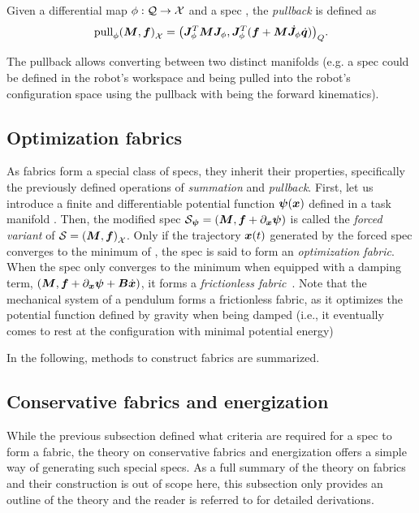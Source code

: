 Given a differential map $\phi: \mathcal{Q}\rightarrow\mathcal{X}$ and a spec
\spec{}, the \textit{pullback} is defined as
\begin{equation}
  \textrm{pull}_{\phi}{\left(\bm{M},\bm{f}\right)_{\mathcal{X}}} = {\left(\bm{J}^T_{\phi}\bm{M}\bm{J}_{\phi}, \bm{J}^T_{\phi}(\bm{f}+\bm{M}\dot{\bm{J}}_{\phi}\dot{\bm{q}})\right)}_{Q}.
  \label{eq:pullback}
\end{equation}

The pullback allows converting between two distinct
manifolds (e.g. a spec could be defined in the robot's
workspace and being pulled into the robot's configuration
space using the pullback with \map{} being the forward
kinematics).

\subsection{Optimization fabrics}%
\label{sub:optimization_fabrics}

As \ac{fabrics} form a special class of specs, they
inherit their properties, specifically the previously
defined operations of \textit{summation} and
\textit{pullback}. First, let us introduce a finite and
differentiable potential function $\bm{\psi}(\bm{x})$ defined in a
task manifold \X{}. Then, the modified spec $\mathcal{S}_{\bm{\psi}} =
\left(\bm{M},\bm{f} + \partial_{\bm{x}}\bm{\psi}\right)$ is called the
\textit{forced variant} of $\mathcal{S} = \left(\bm{M},\bm{f}\right)_{\mathcal{X}}$. Only if the
trajectory $\bm{x}(t)$ generated by the forced spec converges to
the minimum of \forc{}, the spec is said to form an
\textit{optimization fabric}. When the spec only converges
to the minimum when equipped with a damping term,
$\left(\bm{M},\bm{f} + \partial_{\bm{x}}\bm{\psi} + \bm{B}\dot{\bm{x}}\right)$, it
forms a \textit{frictionless fabric}~\cite[Definition
4.4]{Ratliff2020}. Note that the mechanical system of a
pendulum forms a frictionless fabric, as it optimizes the
potential function defined by gravity when being damped
(i.e., it eventually comes to rest at the configuration with
minimal potential energy)

In the following, methods to construct \ac{fabrics} are
summarized.

\subsection{Conservative fabrics and energization}%
\label{sub:conservative_fabrics_and_energization}

While the previous subsection defined what criteria are required for a spec to form
a \ac{fabric}, the theory on conservative fabrics and energization 
offers a simple way of generating such special specs. As a full summary of the theory
on \ac{fabrics} and their construction is out of scope here, this
subsection only provides an outline of the theory and the reader is referred to 
\cite{Ratliff2021,Wyk2022} for detailed derivations.

